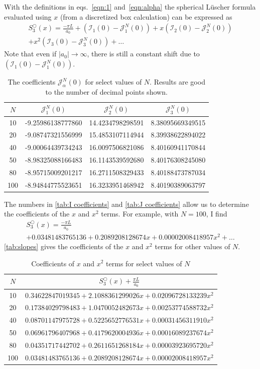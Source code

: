 \documentclass[11pt]{article}
\begin{document}
With the definitions in eqs.~\eqref{eqn:1} and~\eqref{eqn:alpha} the spherical L\"uscher formula evaluated using $x$ (from a discretized box calculation) can be expressed as
\begin{multline}
S^\bigcirc_3(x)=\frac{-\pi L}{a_0}+\left(\mathcal{I}_1(0)-\mathcal{J}_1^N(0)\right)+x\left(\mathcal{I}_2(0)-\mathcal{J}_2^N(0)\right)\\
+x^2\left(\mathcal{I}_3(0)-\mathcal{J}_3^N(0)\right)+\ldots
\end{multline}
Note that even if $|a_0|\to\infty$, there is still a constant shift due to $\left(\mathcal{I}_1(0)-\mathcal{J}_1^N(0)\right)$.   
\begin{table}
\caption{The coefficients $\mathcal{J}_\alpha^N(0)$ for select values of $N$.  Results are good to the number of decimal points shown. \label{tab:J coefficients}}
\center
\begin{tabular}{c||c|c|c}
$N$ & $\mathcal{J}_1^N(0)$ & $\mathcal{J}_2^N(0)$ &$\mathcal{J}_3^N(0)$ \\
\hline
10 & -9.25986138777860 & 14.4234798298591 & 8.38095669349515\\
20 & -9.08747321556999 & 15.4853107114944 & 8.39938622894022\\
40 & -9.00064439734243 & 16.0097506821086 & 8.40160941170844\\
50 & -8.98325088166483 & 16.1143539592680 & 8.40176308245080\\
80 & -8.95715009201217 & 16.2711508329433 & 8.40188473787034\\
100 & -8.94844775523651 & 16.3233951468942 & 8.40190389063797
\end{tabular}
\end{table}
The numbers in \autoref{tab:I coefficients} and \autoref{tab:J coefficients} allow us to determine the coefficients of the $x$ and $x^2$ terms.  For example, with $N=100$, I find
\begin{multline}
S^\bigcirc_3(x)=\frac{-\pi L}{a_0}\\
+0.03481483765136+0.2089208128674 x+0.00002008418957 x^2+\ldots
\end{multline}
\autoref{tab:slopes} gives the coefficients of the $x$ and $x^2$ terms for other values of $N$.
\begin{table}
\caption{Coefficients of $x$ and $x^2$ terms for select values of $N$\label{tab:slopes}}
\center
\begin{tabular}{c|c}
$N$ & $S^\bigcirc_3(x)+\frac{\pi L}{a_0}$ \\
\hline
10 & $0.34622847019345+2.1088361299026 x+0.02096728133239 x^2$\\
20 & $0.17384029798483+1.0470052482673 x+0.00253774588732 x^2$\\
40 & $0.08701147975728+0.5225652776531 x+0.00031456311910 x^2$\\
50 & $0.06961796407968+0.4179620004936 x+0.00016089237674 x^2$\\
80 & $0.04351717442702+0.2611651268184 x+0.00003923695720 x^2$\\
100 &$0.03481483765136+0.2089208128674 x+0.00002008418957 x^2$
\end{tabular}
\end{table}
\end{document}
